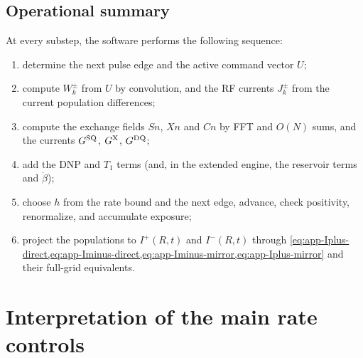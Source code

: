 \documentclass[11pt]{article}
\newcommand{\Iplus}{I^{+}}
\newcommand{\Iminus}{I^{-}}
\begin{document}
\subsection{Operational summary}

At every substep, the software performs the following sequence:
\begin{enumerate}
  \item determine the next pulse edge and the active command vector \(U\);
  \item compute \(W^\pm_k\) from \(U\) by convolution, and the RF currents \(J^\pm_k\) from the current population differences;
  \item compute the exchange fields \(Sn\), \(Xn\) and \(Cn\) by FFT and \(O(N)\) sums, and the currents \(G^{\rm SQ}\), \(G^{\rm X}\), \(G^{\rm DQ}\);
  \item add the DNP and \(T_1\) terms (and, in the extended engine, the reservoir terms and \(\dot\beta\));
  \item choose \(h\) from the rate bound and the next edge, advance, check positivity, renormalize, and accumulate exposure;
  \item project the populations to \(\Iplus(R,t)\) and \(\Iminus(R,t)\) through \cref{eq:app-Iplus-direct,eq:app-Iminus-direct,eq:app-Iminus-mirror,eq:app-Iplus-mirror} and their full-grid equivalents.
\end{enumerate}

\section{Interpretation of the main rate controls}
\end{document}
